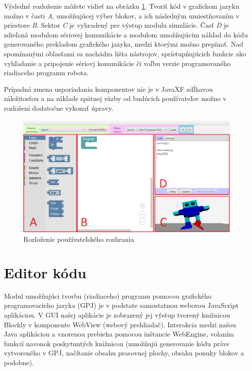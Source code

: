 Výsledné rozloženie môžete vidieť na obrázku \ref{obr:gui-layout}. Tvoriť kód v grafickom jazyku možno v časti \textit{A}, umožňujúcej výber blokov, a ich následným umiestňovaním v priestore \textit{B}. Sektor \textit{C} je vyhradený pre výstup modulu simulácie. Časť \textit{D} je zdieľaná modulom sériovej komunikácie a modulom umožňujúcim náhľad do kódu generovaného prekladom grafického jazyka, medzi ktorými možno prepínať. Nad spomínanými oblasťami sa nachádza lišta nástrojov, sprístupňujúcich funkcie ako vyhľadanie a pripojenie sériovj komunikácie či voľbu verzie programovaného riadiaceho programu robota.

Prípadná zmena usporiadania komponentov nie je v JavaXF zdĺhavou záležitosťou a na základe spätnej väzby od budúcich používateľov možno v rozložení dodatočne vykonať úpravy.

\begin{figure}
\centerline{\includegraphics[width=1\textwidth]{images/rozlozenie-gui}}
\caption[Rozloženie používateľského rozhrania]{Rozloženie používateľského rozhrania}
\label{obr:gui-layout}
\end{figure}


\section{Editor kódu}
Modul umožňujúci tvorbu (riadiaceho) programu pomocou grafického programovacieho jazyka (GPJ) je v podstate samostatnou webovou JavaScript aplikáciou. V GUI našej aplikácie je zobrazený jej výstup tvorený knižnicou Blockly v komponente WebView (webový prehliadač). Interakcia medzi našou Java aplikáciou a vnorenou  prebieha pomocou inštancie WebEngine, volaním funkcií navonok poskytnutých knižnicou (umožňujú generovanie kódu práve vytvoreného v GPJ, načítanie obsahu pracovnej plochy, obsahu ponuky blokov a podobne).

